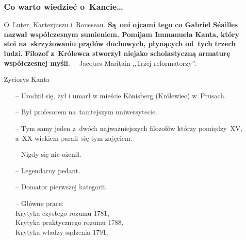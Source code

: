\documentclass{beamer}  %
\begin{document}
\begin{frame}
  \frametitle{Co warto wiedzieć o~Kancie\ldots}

  \begin{block}{O~Luter, Kartezjuszu i~Rousseau.}
    \textbf{Są~oni ojcami tego co Gabriel S\'{e}ailles nazwał
      współczesnym sumieniem. Pomijam Immanuela Kanta, który stoi
      na~skrzyżowaniu prądów duchowych, płynących od~tych trzech
      ludzi. Filozof z~Królewca stworzył niejako scholastyczną
      armaturę współczesnej myśli.} --~Jacques Maritain ,,Trzej
    reformatorzy''.
  \end{block}

  \begin{block}{Życiorys Kanta}
    \begin{itemize}
    \item[--] Urodził się, żył i umarł w mieście K\"{o}nisberg
      (Królewiec) w~Prusach.
    \item[--] Był profesorem na~tamtejszym uniwersytecie.
    \item[--] Tym samy jeden z~dwóch najważniejszych filozofów którzy
      pomiędzy~XV, a~XX wiekiem parali~się tym zajęciem.
    \item[--] Nigdy się nie ożenił.
    \item[--] Legendarny pedant.
    \item[--] Domator pierwszej kategorii.
    \item[--] Główne prace: \\
      Krytyka czystego rozumu 1781, \\
      Krytyka praktycznego rozumu 1788, \\
      Krytyka władzy sądzenia 1791.
    \end{itemize}
  \end{block}

\end{frame}
\end{document}
